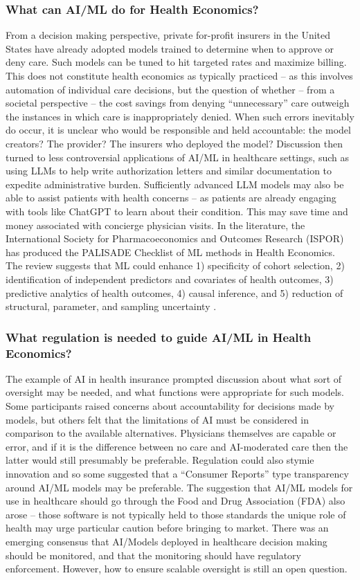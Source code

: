 \subsubsection{What can AI/ML do for Health Economics?}

From a decision making perspective, private for-profit insurers in the United States have already adopted models trained to determine when to approve or deny care. Such models can be tuned to hit targeted rates and maximize billing. This does not constitute health economics as typically practiced – as this involves automation of individual care decisions, but the question of whether – from a societal perspective – the cost savings from denying “unnecessary” care outweigh the instances in which care is inappropriately denied. When such errors inevitably do occur, it is unclear who would be responsible and held accountable: the model creators? The provider? The insurers who deployed the model? 
Discussion then turned to less controversial applications of AI/ML in healthcare settings, such as using LLMs to help write authorization letters and similar documentation to expedite administrative burden. Sufficiently advanced LLM models may also be able to assist patients with health concerns – as patients are already engaging with tools like ChatGPT to learn about their condition. This may save time and money associated with concierge physician visits. 
In the literature, the International Society for Pharmacoeconomics and Outcomes Research (ISPOR) has produced the PALISADE Checklist of ML methods in Health Economics. The review suggests that ML could enhance 1) specificity of cohort selection, 2) identification of independent predictors and covariates of health outcomes, 3) predictive analytics of health outcomes, 4) causal inference, and 5) reduction of structural, parameter, and sampling uncertainty \citep{padula2022machine}. 

\subsubsection{What regulation is needed to guide AI/ML in Health Economics?}

The example of AI in health insurance prompted discussion about what sort of oversight may be needed, and what functions were appropriate for such models. Some participants raised concerns about accountability for decisions made by models, but others felt that the limitations of AI must be considered in comparison to the available alternatives. Physicians themselves are capable or error, and if it is the difference between no care and AI-moderated care then the latter would still presumably be preferable. Regulation could also stymie innovation and so some suggested that a “Consumer Reports” type transparency around AI/ML models may be preferable. 
The suggestion that AI/ML models for use in healthcare should go through the Food and Drug Association (FDA) also arose – those software is not typically held to those standards the unique role of health may urge particular caution before bringing to market. 
There was an emerging consensus that AI/Models deployed in healthcare decision making should be monitored, and that the monitoring should have regulatory enforcement. However, how to ensure scalable oversight is still an open question.
